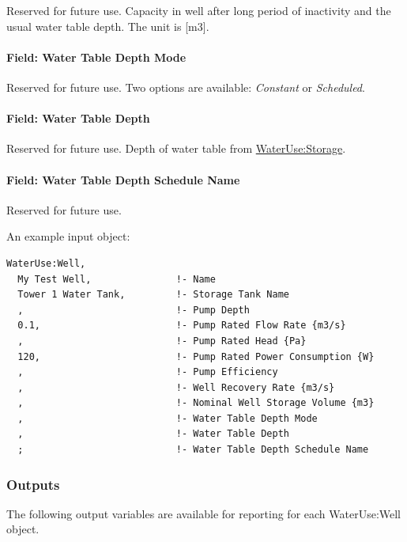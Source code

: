 Reserved for future use. Capacity in well after long period of inactivity and the usual water table depth. The unit is {[}m3{]}.

\paragraph{Field: Water Table Depth Mode}\label{field-water-table-depth-mode}

Reserved for future use. Two options are available: \emph{Constant} or \emph{Scheduled}.

\paragraph{Field: Water Table Depth}\label{field-water-table-depth}

Reserved for future use. Depth of water table from \hyperref[waterusestorage]{WaterUse:Storage}.

\paragraph{Field: Water Table Depth Schedule Name}\label{field-water-table-depth-schedule-name}

Reserved for future use.

An example input object:

\begin{lstlisting}
WaterUse:Well,
  My Test Well,               !- Name
  Tower 1 Water Tank,         !- Storage Tank Name
  ,                           !- Pump Depth
  0.1,                        !- Pump Rated Flow Rate {m3/s}
  ,                           !- Pump Rated Head {Pa}
  120,                        !- Pump Rated Power Consumption {W}
  ,                           !- Pump Efficiency
  ,                           !- Well Recovery Rate {m3/s}
  ,                           !- Nominal Well Storage Volume {m3}
  ,                           !- Water Table Depth Mode
  ,                           !- Water Table Depth
  ;                           !- Water Table Depth Schedule Name
\end{lstlisting}

\subsubsection{Outputs}\label{outputs-4-019}

The following output variables are available for reporting for each WaterUse:Well object.

